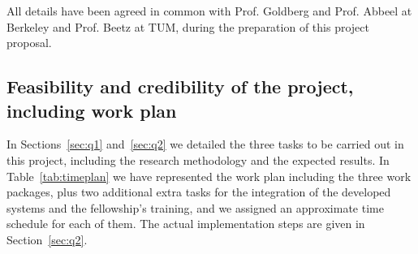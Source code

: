 All details  have been agreed in  common with Prof. Goldberg and Prof. Abbeel  
at Berkeley and Prof. Beetz at TUM, during the preparation of this project proposal.

\subsection{Feasibility and credibility of the project, including work plan} 
In Sections~\ref{sec:q1} and~\ref{sec:q2} we detailed the three tasks to be carried 
out in this project, including the research methodology and the expected results. 
In Table~\ref{tab:timeplan} we have represented the work plan including the three 
work packages, plus two additional extra tasks for the integration of the developed systems
and the fellowship's training, and we assigned an approximate time schedule for each of them.
The actual implementation steps are given in Section~\ref{sec:q2}.

